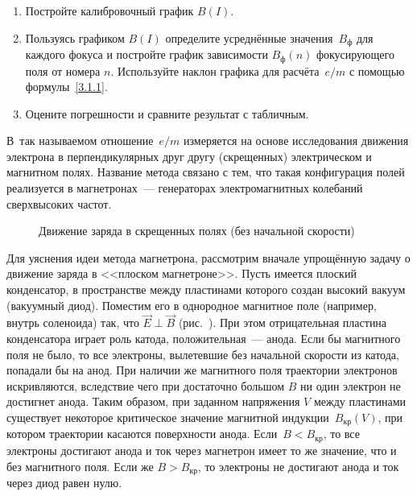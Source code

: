 \begin{lab:task}
\begin{enumerate}
\item Постройте калибровочный график $B(I)$.

\item Пользуясь графиком $B(I)$ определите усреднённые значения~$B_ф$ для каждого
фокуса и постройте график зависимости $B_ф(n)$ фокусирующего поля от номера $n$. 
Используйте наклон графика для расчёта~$e/m$ с помощью формулы~\eqref{3.1.1}.

\item Оцените погрешности и сравните результат с табличным.

\end{enumerate}
\end{lab:task}


В~так называемом {} отношение~$e/m$ измеряется на
основе исследования движения электрона в перпендикулярных друг другу (скрещенных) 
электрическом и магнитном полях. Название метода связано с тем, что такая
конфигурация полей реализуется в магнетронах~--- 
генераторах электромагнитных колебаний сверхвысоких частот.

\begin{figure}[h!]
    \centering
    \caption{Движение заряда в скрещенных полях (без начальной скорости)}
\end{figure}

Для уяснения идеи метода магнетрона, рассмотрим вначале упрощённую
задачу о движение заряда в <<плоском магнетроне>>. 
Пусть имеется плоский конденсатор, в пространстве между пластинами которого создан
высокий вакуум (вакуумный диод). Поместим его в однородное магнитное поле (например,
внутрь соленоида) так, что $\vec{E}\perp\vec{B}$ (рис.~). 
При этом отрицательная пластина конденсатора играет роль катода, 
положительная~--- анода. Если бы магнитного поля не было, то все электроны, 
вылетевшие без начальной скорости из катода, попадали бы на анод. 
При наличии же магнитного поля траектории электронов искривляются, 
вследствие чего при достаточно большом $B$ ни один электрон не достигнет анода.
Таким образом, при
заданном напряжения $V$ между пластинами существует некоторое критическое
значение магнитной индукции~$B_\text{кр}(V)$, при котором траектории касаются
поверхности анода. Если~$B<B_\text{кр}$, то все электроны достигают анода и ток
через магнетрон имеет то же значение, что и без магнитного поля. Если же
$B>B_\text{кр}$, то электроны не достигают анода и ток через диод равен нулю.

